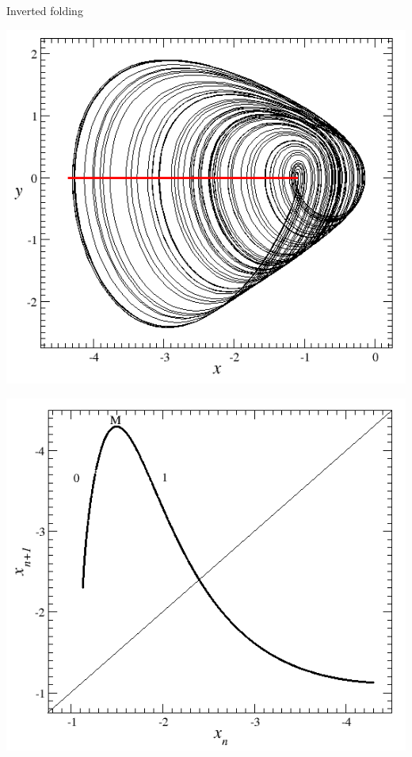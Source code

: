 \documentclass[usenames, dvipsnames, aspectratio=169]{beamer}
\begin{document}
\begin{frame}[t, c]{Inverted folding}{}
  \vfill
  
  \begin{minipage}{.48\textwidth}
    \centering
    \includegraphics[width=\textwidth]{inverted_folding}
  \end{minipage}%
  \hfill
  \begin{minipage}{.48\textwidth}
    \centering
    \includegraphics[width=\textwidth]{inverted_folding_map}
  \end{minipage}

  \vfill
  
\end{frame}
\end{document}

